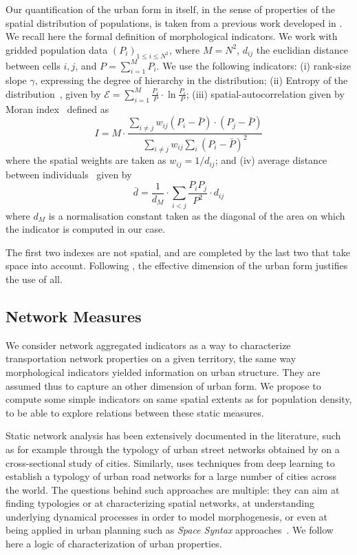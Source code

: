 \documentclass[11pt]{article}
\begin{document}
Our quantification of the urban form in itself, in the sense of properties of the spatial distribution of populations, is taken from a previous work developed in \cite{2017arXiv170806743R}. We recall here the formal definition of morphological indicators. We work with gridded population data $(P_i)_{1\leq i \leq N^2}$, where $M=N^2$, $d_{ij}$ the euclidian distance between cells $i,j$, and $P=\sum_{i=1}^{M} P_i$. We use the following indicators: (i) rank-size slope $\gamma$, expressing the degree of hierarchy in the distribution; (ii) Entropy of the distribution~\citep{le2015forme}, given by $\mathcal{E} = \sum_{i=1}^{M}\frac{P_i}{P}\cdot \ln{\frac{P_i}{P}}$; (iii) spatial-autocorrelation given by Moran index~\citep{tsai2005quantifying} defined as
\[
I = M \cdot \frac{\sum_{i\neq j} w_{ij} \left(P_i - \bar{P}\right)\cdot\left(P_j - \bar{P}\right)}{\sum_{i\neq j} w_{ij} \sum_{i}{\left( P_i - \bar{P}\right)}^2}
\]
where the spatial weights are taken as $w_{ij} = 1/d_{ij}$; and (iv) average distance between individuals~\citep{le2009quantifier} given by
\[
\bar{d} = \frac{1}{d_M}\cdot \sum_{i<j} \frac{P_i P_j}{P^2} \cdot d_{ij}
\]
where $d_M$ is a normalisation constant taken as the diagonal of the area on which the indicator is computed in our case.

The first two indexes are not spatial, and are completed by the last two that take space into account. Following \cite{Schwarz201029}, the effective dimension of the urban form justifies the use of all.


\subsection{Network Measures}


We consider network aggregated indicators as a way to characterize transportation network properties on a given territory, the same way morphological indicators yielded information on urban structure. They are assumed thus to capture an other dimension of urban form. We propose to compute some simple indicators on same spatial extents as for population density, to be able to explore relations between these static measures.

Static network analysis has been extensively documented in the literature, such as for example through the typology of urban street networks obtained by \cite{louf2014typology} on a cross-sectional study of cities. Similarly, \cite{2017arXiv170902939M} uses techniques from deep learning to establish a typology of urban road networks for a large number of cities across the world. The questions behind such approaches are multiple: they can aim at finding typologies or at characterizing spatial networks, at understanding underlying dynamical processes in order to model morphogenesis, or even at being applied in urban planning such as \emph{Space Syntax} approaches~\citep{hillier1989social}. We follow here a logic of characterization of urban properties.
\end{document}
